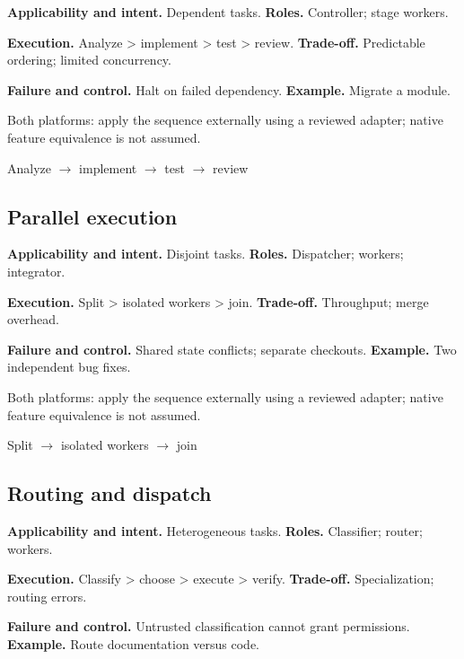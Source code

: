 \textbf{Applicability and intent.} Dependent tasks. \textbf{Roles.} Controller; stage workers.

\textbf{Execution.} Analyze > implement > test > review. \textbf{Trade-off.} Predictable ordering; limited concurrency.

\textbf{Failure and control.} Halt on failed dependency. \textbf{Example.} Migrate a module.

Both platforms: apply the sequence externally using a reviewed adapter; native feature equivalence is not assumed.

\begin{center}\small \textsf{Analyze} $\rightarrow$ \textsf{implement} $\rightarrow$ \textsf{test} $\rightarrow$ \textsf{review}\end{center}

\subsection{Parallel execution}

\textbf{Applicability and intent.} Disjoint tasks. \textbf{Roles.} Dispatcher; workers; integrator.

\textbf{Execution.} Split > isolated workers > join. \textbf{Trade-off.} Throughput; merge overhead.

\textbf{Failure and control.} Shared state conflicts; separate checkouts. \textbf{Example.} Two independent bug fixes.

Both platforms: apply the sequence externally using a reviewed adapter; native feature equivalence is not assumed.

\begin{center}\small \textsf{Split} $\rightarrow$ \textsf{isolated workers} $\rightarrow$ \textsf{join}\end{center}

\subsection{Routing and dispatch}

\textbf{Applicability and intent.} Heterogeneous tasks. \textbf{Roles.} Classifier; router; workers.

\textbf{Execution.} Classify > choose > execute > verify. \textbf{Trade-off.} Specialization; routing errors.

\textbf{Failure and control.} Untrusted classification cannot grant permissions. \textbf{Example.} Route documentation versus code.

